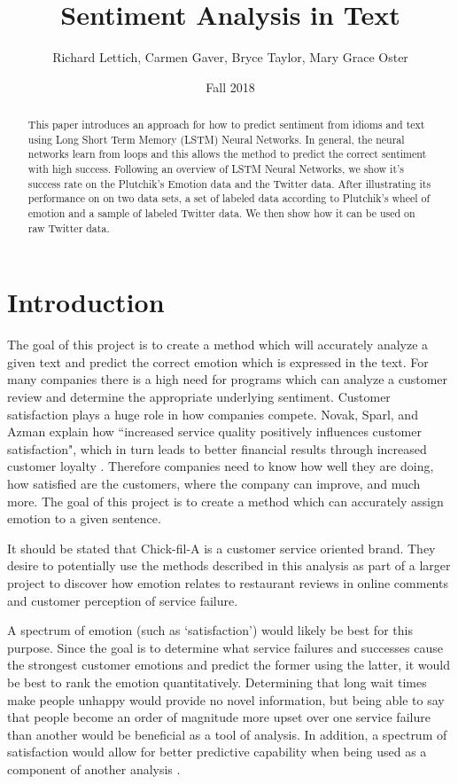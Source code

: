 \documentclass[titlepage,letterpaper]{article}
\title{Sentiment Analysis in Text}
\author{Richard Lettich, Carmen Gaver, Bryce Taylor, Mary Grace Oster}
\date{Fall 2018}
\begin{document}
\maketitle

\tableofcontents

\begin{abstract}
This paper introduces an approach for how to predict sentiment from idioms and text using Long Short Term Memory (LSTM) Neural Networks. In general, the neural networks learn from loops and this allows the method to predict the correct sentiment with high success. Following an overview of LSTM Neural Networks, we show it's success rate on the Plutchik's Emotion data and the Twitter data. After illustrating its performance on on two data sets, a set of labeled data according to Plutchik's wheel of emotion and a sample of labeled Twitter data. We then show how it can be used on raw Twitter data. \\
\end{abstract}

\section{Introduction}

The goal of this project is to create a method which will accurately analyze a given text and predict the correct emotion which is expressed in the text. For many companies there is a high need for programs which can analyze a customer review and determine the appropriate underlying sentiment. Customer satisfaction plays a huge role in how companies compete. Novak, Sparl, and Azman explain how ``increased service quality positively influences customer satisfaction", which in turn leads to better financial results through increased customer loyalty \cite{BusinessCustomerSatisfaction}. Therefore companies need to know how well they are doing, how satisfied are the customers, where the company can improve, and much more. The goal of this project is to create a method which can accurately assign emotion to a given sentence.

It should be stated that Chick-fil-A is a customer service oriented brand. They desire to potentially use the methods described in this analysis as part of a larger project to discover how emotion relates to restaurant reviews in online comments and customer perception of service failure.

A spectrum of emotion (such as `satisfaction') would likely be best for this purpose. Since the goal is to determine what service failures and successes cause the strongest customer emotions and predict the former using the latter, it would be best to rank the emotion quantitatively. Determining that long wait times make people unhappy would provide no novel information, but being able to say that people become an order of magnitude more upset over one service failure than another would be beneficial as a tool of analysis. In addition, a spectrum of satisfaction would allow for better predictive capability when being used as a component of another analysis \cite{lowriwilliams}.
\end{document}
